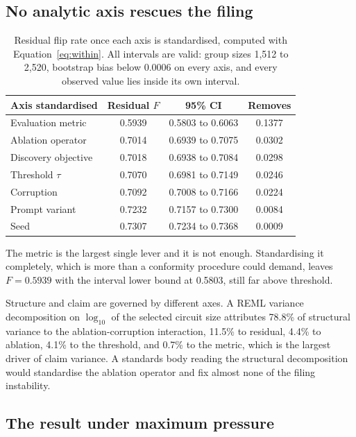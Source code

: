 \documentclass[11pt]{article}
\begin{document}
\subsection{No analytic axis rescues the filing}

\begin{table}[htbp]
\centering
\caption{Residual flip rate once each axis is standardised, computed with
Equation~\ref{eq:within}. All intervals are valid: group sizes 1{,}512 to 2{,}520,
bootstrap bias below 0.0006 on every axis, and every observed value lies inside
its own interval.}
\label{tab:fixed}
\begin{tabular}{lccc}
\toprule
Axis standardised & Residual $F$ & 95\% CI & Removes \\
\midrule
Evaluation metric & 0.5939 & 0.5803 to 0.6063 & 0.1377 \\
Ablation operator & 0.7014 & 0.6939 to 0.7075 & 0.0302 \\
Discovery objective & 0.7018 & 0.6938 to 0.7084 & 0.0298 \\
Threshold $\tau$ & 0.7070 & 0.6981 to 0.7149 & 0.0246 \\
Corruption & 0.7092 & 0.7008 to 0.7166 & 0.0224 \\
Prompt variant & 0.7232 & 0.7157 to 0.7300 & 0.0084 \\
Seed & 0.7307 & 0.7234 to 0.7368 & 0.0009 \\
\bottomrule
\end{tabular}
\end{table}

The metric is the largest single lever and it is not enough. Standardising it
completely, which is more than a conformity procedure could demand, leaves
$F = 0.5939$ with the interval lower bound at 0.5803, still far above threshold.

Structure and claim are governed by different axes. A REML variance decomposition
on $\log_{10}$ of the selected circuit size attributes 78.8\% of structural
variance to the ablation-corruption interaction, 11.5\% to residual, 4.4\% to
ablation, 4.1\% to the threshold, and 0.7\% to the metric, which is the largest
driver of claim variance. A standards body reading the structural decomposition
would standardise the ablation operator and fix almost none of the filing
instability.

\subsection{The result under maximum pressure}
\end{document}
